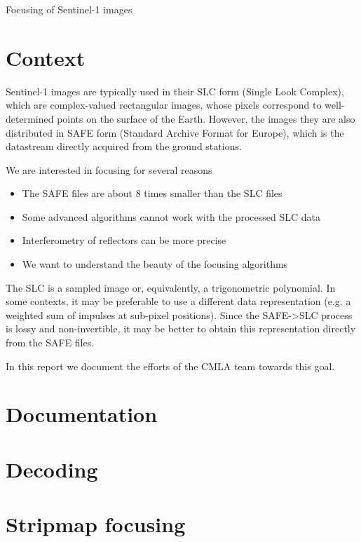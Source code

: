 \documentclass[a4paper]{article}           %
\newcommand{\1}{\mathbf{1}}
\begin{document}
{\Large Focusing of Sentinel-1 images}
\vspace{2em}

\section{Context}

Sentinel-1 images are typically used in their SLC form (Single Look Complex),
which are complex-valued rectangular images, whose pixels correspond to
well-determined points on the surface of the Earth.  However, the images they
are also distributed in SAFE form (Standard Archive Format for Europe), which
is the datastream directly acquired from the ground stations.

We are interested in focusing for several reasons
\begin{itemize}
	\item The SAFE files are about 8 times smaller than the SLC files
	\item Some advanced algorithms cannot work with the processed SLC data
	\item Interferometry of reflectors can be more precise
	\item We want to understand the beauty of the focusing algorithms
\end{itemize}

The SLC is a sampled image or, equivalently, a trigonometric polynomial.  In
some contexts, it may be preferable to use a different data representation
(e.g. a weighted sum of impulses at sub-pixel positions).
Since the SAFE->SLC process is lossy and non-invertible, it may be better to
obtain this representation directly from the SAFE files.

In this report we document the efforts of the CMLA team towards this goal.

\section{Documentation}



\section{Decoding}

\section{Stripmap focusing}
\end{document}
